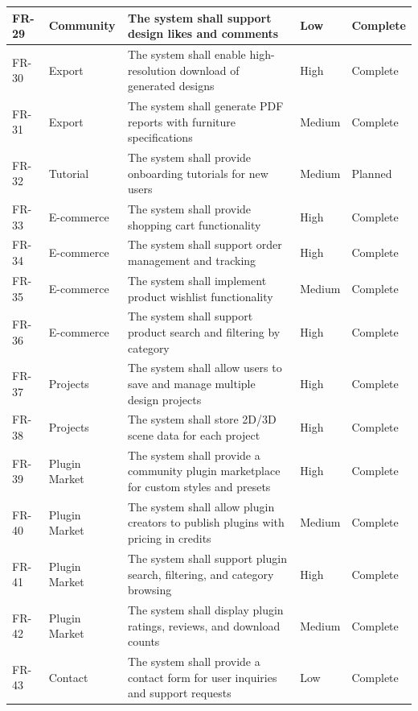 \begin{longtable}{|p{1.2cm}|p{2.8cm}|p{5.4cm}|p{1.5cm}|p{1.8cm}|}
    \hline
    FR-29 & Community & The system shall support design likes and comments & Low & Complete \\
    \hline
    FR-30 & Export & The system shall enable high-resolution download of generated designs & High & Complete \\
    \hline
    FR-31 & Export & The system shall generate PDF reports with furniture specifications & Medium & Complete \\
    \hline
    FR-32 & Tutorial & The system shall provide onboarding tutorials for new users & Medium & Planned \\
    \hline
    FR-33 & E-commerce & The system shall provide shopping cart functionality & High & Complete \\
    \hline
    FR-34 & E-commerce & The system shall support order management and tracking & High & Complete \\
    \hline
    FR-35 & E-commerce & The system shall implement product wishlist functionality & Medium & Complete \\
    \hline
    FR-36 & E-commerce & The system shall support product search and filtering by category & High & Complete \\
    \hline
    FR-37 & Projects & The system shall allow users to save and manage multiple design projects & High & Complete \\
    \hline
    FR-38 & Projects & The system shall store 2D/3D scene data for each project & High & Complete \\
    \hline
    FR-39 & Plugin Market & The system shall provide a community plugin marketplace for custom styles and presets & High & Complete \\
    \hline
    FR-40 & Plugin Market & The system shall allow plugin creators to publish plugins with pricing in credits & Medium & Complete \\
    \hline
    FR-41 & Plugin Market & The system shall support plugin search, filtering, and category browsing & High & Complete \\
    \hline
    FR-42 & Plugin Market & The system shall display plugin ratings, reviews, and download counts & Medium & Complete \\
    \hline
    FR-43 & Contact & The system shall provide a contact form for user inquiries and support requests & Low & Complete \\
    \hline
\end{longtable}

